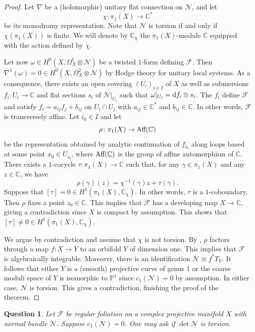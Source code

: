 \documentclass[english,10pt]{amsart}
\newcommand{\cF}{\mathcal{F}}
\newcommand{\sN}{\mathscr{N}}
\newcommand{\dd}{\textup{d}}
\newtheorem{question}[thm]{Question}
\theoremstyle{definition}
\theoremstyle{remark}
\numberwithin{equation}{section}
\begin{document}
\begin{proof}
Let $\nabla$ be a (holomorphic) unitary flat connection on $\sN$, and let 
\[\chi \colon \pi_1(X) \to \mathbb{C^*}
\] 
be its monodromy representation. Note that $\sN$ is torsion if and only if $\chi (\pi_1(X))$ is finite. We will denote by $\mathbb{C}_\chi$ the $\pi_1(X)$-module $\mathbb{C}$ equipped with the action defined by $\chi$.

Let now $\omega \in H^0(X,\Omega_X^1\otimes \sN)$ be a twisted $1$-form defining $\cF$. Then $\nabla^1(\omega)=0 \in H^0(X,\Omega_X^2\otimes \sN)$ by Hodge theory for unitary local systems. As a consequence, there exists 
an open covering $(U_i)_{i \in I}$ of $X$ as well as submersions $f_i \colon U_i \to \mathbb{C}$ and flat sections $s_i$ of $\sN|_{U_i}$ such that $\omega|_{U_i}=\dd f_i \otimes s_i$. The $f_i$ define $\cF$ and satisfy $f_i=a_{ij}f_j+b_{ij}$ on $U_i\cap U_j$ with $a_{ij} \in \mathbb{C}^*$ and $b_{ij} \in \mathbb{C}$. In other words, $\cF$ is transversely affine. Let $i_0 \in I$ and let
\[
\rho \colon \pi_1(X) \to \textup{Aff}(\mathbb{C})
\]
be the representation obtained by analytic continuation of $f_{i_0}$ along loops based at some point $x_0 \in U_{i_0}$, where $\textup{Aff}(\mathbb{C})$ is the group of affine automorphism of $\mathbb{C}$. There exists a $1$-cocycle $\tau \colon \pi_1(X) \to \mathbb{C}$ such that, for any $\gamma \in \pi_1(X)$ and any $z \in \mathbb{C}$, we have 
\[
\rho(\gamma)(z)=\chi^{-1}(\gamma)z+\tau(\gamma).
\]
Suppose that $[\tau]=0 \in H^1(\pi_1(X),\mathbb{C}_\chi)$. In other words, $\tau$ is a $1$-coboundary. Then $\rho$ fixes a point $z_0 \in \mathbb{C}$. This implies that $\cF$ has a developing map $X \to \mathbb{C}$, giving a contradiction since $X$ is compact by assumption. This shows that $[\tau] \neq 0 \in H^1(\pi_1(X),\mathbb{C}_\chi)$.

We argue by contradiction and assume that $\chi$ is not torsion. By \cite[Theorem 5.1]{bartolo_al_2013}, $\rho$ factors through a map $f \colon X \to Y$ to an orbifold $Y$ of dimension one. This implies that $\cF$ is algebraically integrable. Moreover, there is an identification $\sN \cong f^*T_Y$. It follows that either $Y$ is a (smooth) projective curve of genus $1$ or the coarse moduli space of $Y$ is isomorphic to $\mathbb{P}^1$ since $c_1(\sN)=0$ by assumption. In either case, $\sN$ is torsion. This gives a contradiction, finishing the proof of the theorem.
\end{proof}

\begin{question}\label{question:abundance_2}
Let $\cF$ be regular foliation on a complex projective manifold $X$ with normal bundle $\sN$. Suppose $c_1(\sN)=0$. One may ask if $\det \sN$ is torsion. 
\end{question}



\end{document}
